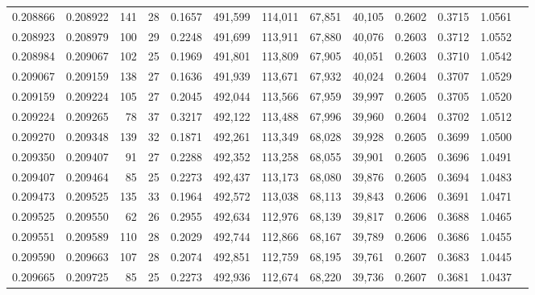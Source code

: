 \begin{tabular}{rrrrrrrrrrrrr}
0.208866 & 0.208922 & 141 &  28 &                                     0.1657 & 491,599 & 114,011 &  67,851 &  40,105 & 0.2602 & 0.3715 & 1.0561 \\
0.208923 & 0.208979 & 100 &  29 &                                     0.2248 & 491,699 & 113,911 &  67,880 &  40,076 & 0.2603 & 0.3712 & 1.0552 \\
0.208984 & 0.209067 & 102 &  25 &                                     0.1969 & 491,801 & 113,809 &  67,905 &  40,051 & 0.2603 & 0.3710 & 1.0542 \\
0.209067 & 0.209159 & 138 &  27 &                                     0.1636 & 491,939 & 113,671 &  67,932 &  40,024 & 0.2604 & 0.3707 & 1.0529 \\
0.209159 & 0.209224 & 105 &  27 &                                     0.2045 & 492,044 & 113,566 &  67,959 &  39,997 & 0.2605 & 0.3705 & 1.0520 \\
0.209224 & 0.209265 &  78 &  37 &                                     0.3217 & 492,122 & 113,488 &  67,996 &  39,960 & 0.2604 & 0.3702 & 1.0512 \\
0.209270 & 0.209348 & 139 &  32 &                                     0.1871 & 492,261 & 113,349 &  68,028 &  39,928 & 0.2605 & 0.3699 & 1.0500 \\
0.209350 & 0.209407 &  91 &  27 &                                     0.2288 & 492,352 & 113,258 &  68,055 &  39,901 & 0.2605 & 0.3696 & 1.0491 \\
0.209407 & 0.209464 &  85 &  25 &                                     0.2273 & 492,437 & 113,173 &  68,080 &  39,876 & 0.2605 & 0.3694 & 1.0483 \\
0.209473 & 0.209525 & 135 &  33 &                                     0.1964 & 492,572 & 113,038 &  68,113 &  39,843 & 0.2606 & 0.3691 & 1.0471 \\
0.209525 & 0.209550 &  62 &  26 &                                     0.2955 & 492,634 & 112,976 &  68,139 &  39,817 & 0.2606 & 0.3688 & 1.0465 \\
0.209551 & 0.209589 & 110 &  28 &                                     0.2029 & 492,744 & 112,866 &  68,167 &  39,789 & 0.2606 & 0.3686 & 1.0455 \\
0.209590 & 0.209663 & 107 &  28 &                                     0.2074 & 492,851 & 112,759 &  68,195 &  39,761 & 0.2607 & 0.3683 & 1.0445 \\
0.209665 & 0.209725 &  85 &  25 &                                     0.2273 & 492,936 & 112,674 &  68,220 &  39,736 & 0.2607 & 0.3681 & 1.0437 \\

\end{tabular}
